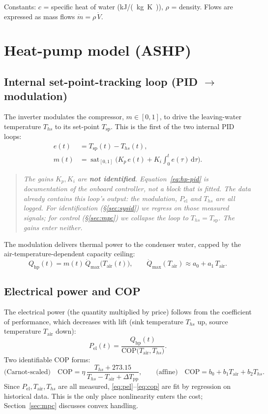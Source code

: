 \documentclass[11pt,a4paper]{article}
\DeclareMathOperator{\sat}{sat}
\newcommand{\COP}{\mathrm{COP}}
\newcommand{\Qmax}{\dot{Q}_{\max}}
\newcommand{\Ths}{T_{hs}}          %
\newcommand{\Tsp}{T_{\mathrm{sp}}} %
\newcommand{\Tair}{T_{\mathrm{air}}}
\newcommand{\Qhp}{Q_{\mathrm{hp}}}
\newcommand{\Pel}{P_{\mathrm{el}}}
\newcommand{\cw}{c}                %
\begin{document}
Constants: $\cw$ = specific heat of water (\si{kJ/(kg.K)}), $\rho$ = density.
Flows are expressed as mass flows $\dot m = \rho\,\dot V$.

\section{Heat-pump model (ASHP)}

\subsection{Internal set-point-tracking loop (PID $\to$ modulation)}
The inverter modulates the compressor, $m\in[0,1]$, to drive the leaving-water
temperature $\Ths$ to its set-point $\Tsp$. This is the first of the two internal
PID loops:
\begin{align}
  e(t) &= \Tsp(t) - \Ths(t), \\
  m(t) &= \sat_{[0,1]}\!\Big( K_p\,e(t) + K_i\!\int_0^t e(\tau)\,\mathrm d\tau \Big).
  \label{eq:hp-pid}
\end{align}

\begin{quote}\small\itshape
The gains $K_p,K_i$ are \textbf{not identified}. Equation~\eqref{eq:hp-pid} is
documentation of the onboard controller, not a block that is fitted. The data
already contains this loop's \emph{output}: the modulation, $\Pel$ and $\Ths$ are
all logged. For identification (\S\ref{sec:sysid}) we regress on those measured
signals; for control (\S\ref{sec:mpc}) we collapse the loop to $\Ths=\Tsp$. The
gains enter neither.
\end{quote}
The modulation delivers thermal power to the condenser water, capped by the
air-temperature-dependent capacity ceiling:
\begin{equation}
  \Qhp(t) = m(t)\,\Qmax\!\big(\Tair(t)\big), \qquad
  \Qmax(\Tair) \approx a_0 + a_1\,\Tair .
  \label{eq:qhp}
\end{equation}

\subsection{Electrical power and COP}
The electrical power (the quantity multiplied by price) follows from the coefficient
of performance, which decreases with lift (sink temperature $\Ths$ up, source
temperature $\Tair$ down):
\begin{equation}
  \Pel(t) = \frac{\Qhp(t)}{\COP\big(\Tair,\Ths\big)}.
  \label{eq:pel}
\end{equation}
Two identifiable COP forms:
\begin{equation}
  \text{(Carnot-scaled)}\quad
  \COP = \eta\,\frac{\Ths+273.15}{\Ths-\Tair+\Delta T_{\text{pp}}},
  \qquad
  \text{(affine)}\quad
  \COP = b_0 + b_1\Tair + b_2\Ths .
  \label{eq:cop}
\end{equation}
Since $\Pel,\Tair,\Ths$ are all measured, \eqref{eq:pel}--\eqref{eq:cop} are fit by
regression on historical data. This is the only place nonlinearity enters the cost;
Section~\ref{sec:mpc} discusses convex handling.
\end{document}
